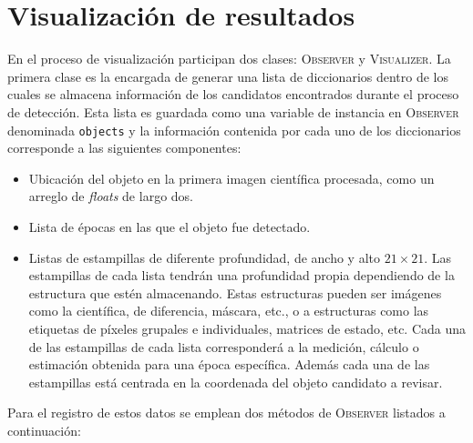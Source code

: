 \section{Visualizaci\'on de resultados}
En el proceso de visualizaci\'on participan dos clases: \textsc{Observer} y \textsc{Visualizer}. La primera clase es la encargada de generar una lista de diccionarios dentro de los cuales se almacena informaci\'on de los candidatos encontrados durante el proceso de detecci\'on. Esta lista es guardada como una variable de instancia en \textsc{Observer} denominada \texttt{objects} y la informaci\'on contenida por cada uno de los diccionarios corresponde a las siguientes componentes:

\begin{itemize}
\item Ubicaci\'on del objeto en la primera imagen cient\'ifica procesada, como un arreglo de \textit{floats} de largo dos. 
\item Lista de \'epocas en las que el objeto fue detectado.
\item Listas de estampillas de diferente profundidad, de ancho y alto $21 \times 21$. Las estampillas de cada lista tendr\'an una profundidad propia dependiendo de la estructura que est\'en almacenando. Estas estructuras pueden ser im\'agenes como la cient\'ifica, de diferencia, m\'ascara, etc., o a estructuras como las etiquetas de p\'ixeles grupales e individuales, matrices de estado, etc. Cada una de las estampillas de cada lista corresponder\'a a la medici\'on, c\'alculo o estimaci\'on obtenida para una \'epoca espec\'ifica. Adem\'as cada una de las estampillas est\'a centrada en la coordenada del objeto candidato a revisar.   
\end{itemize}
\bigskip

Para el registro de estos datos se emplean dos m\'etodos de \textsc{Observer} listados a continuaci\'on:

